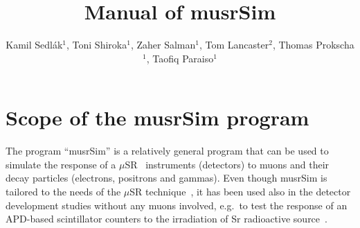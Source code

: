 \documentclass[twoside]{dis04}
\begin{document}
\newcommand{\musr}{\ensuremath{\mu}SR}

\title{Manual of musrSim}

\author{Kamil Sedl\'ak$^1$, Toni Shiroka$^1$, Zaher Salman$^1$, Tom Lancaster$^2$, Thomas Prokscha$^1$, Taofiq Paraiso$^1$}

\address{{$^1$ Laboratory for Muon Spin Spectroscopy, Paul Scherrer Institut, CH-5232 Villigen PSI, Switzerland}\\
$^2$ Clarendon Laboratory, Department of Physics, Oxford University, Parks Road, Oxford OX1 3PU, UK}

\maketitle


\section{Scope of the musrSim program}
The program ``musrSim'' is a relatively general program that can be used to simulate 
the response of a $\mu$SR~\cite{Blundel:1999} instruments (detectors) to muons and their decay particles 
(electrons, positrons and gammas).  Even though musrSim is tailored to the needs of 
the $\mu$SR technique~\cite{shirokaGeant}, it has been used also in the detector development
studies without any muons involved, e.g.\ to test the response of an APD-based 
scintillator counters to the irradiation of Sr radioactive source~\cite{AlexeyTestAPD}.
\end{document}
